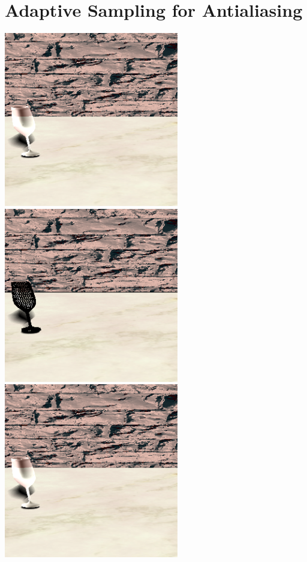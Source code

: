 \documentclass{article}
\begin{document}
\section{Adaptive Sampling for Antialiasing}
\includegraphics[width=3in]{Assets/no_antialiasing.png} \\
\includegraphics[width=3in]{Assets/antialiasing2.png}
\includegraphics[width=3in]{Assets/antialiasing.png}
\end{document}
